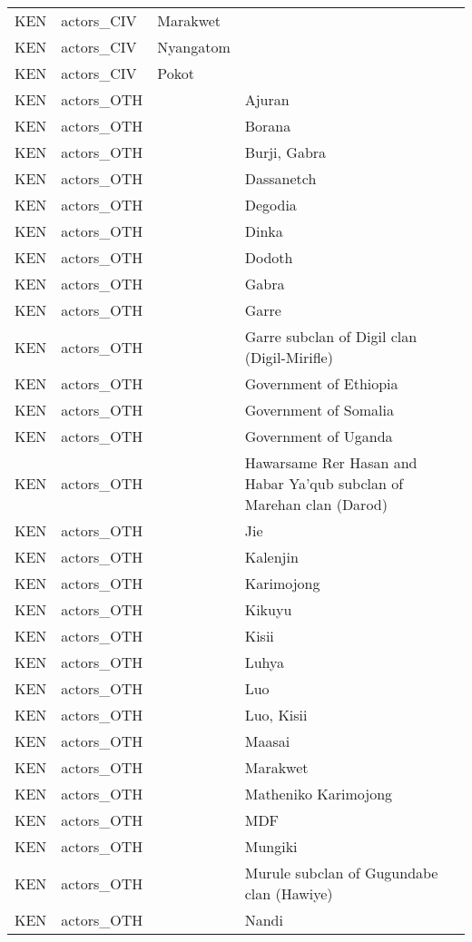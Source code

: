 \begin{table}[ht]
\begin{tabular}{llll}
  KEN & actors\_CIV & Marakwet &  \\ 
  KEN & actors\_CIV & Nyangatom &  \\ 
  KEN & actors\_CIV & Pokot &  \\ 
  KEN & actors\_OTH &  & Ajuran \\ 
  KEN & actors\_OTH &  & Borana \\ 
  KEN & actors\_OTH &  & Burji, Gabra \\ 
  KEN & actors\_OTH &  & Dassanetch \\ 
  KEN & actors\_OTH &  & Degodia \\ 
  KEN & actors\_OTH &  & Dinka \\ 
  KEN & actors\_OTH &  & Dodoth \\ 
  KEN & actors\_OTH &  & Gabra \\ 
  KEN & actors\_OTH &  & Garre \\ 
  KEN & actors\_OTH &  & Garre subclan of Digil clan (Digil-Mirifle) \\ 
  KEN & actors\_OTH &  & Government of Ethiopia \\ 
  KEN & actors\_OTH &  & Government of Somalia \\ 
  KEN & actors\_OTH &  & Government of Uganda \\ 
  KEN & actors\_OTH &  & Hawarsame Rer Hasan and Habar Ya'qub subclan of Marehan clan (Darod) \\ 
  KEN & actors\_OTH &  & Jie \\ 
  KEN & actors\_OTH &  & Kalenjin \\ 
  KEN & actors\_OTH &  & Karimojong \\ 
  KEN & actors\_OTH &  & Kikuyu \\ 
  KEN & actors\_OTH &  & Kisii \\ 
  KEN & actors\_OTH &  & Luhya \\ 
  KEN & actors\_OTH &  & Luo \\ 
  KEN & actors\_OTH &  & Luo, Kisii \\ 
  KEN & actors\_OTH &  & Maasai \\ 
  KEN & actors\_OTH &  & Marakwet \\ 
  KEN & actors\_OTH &  & Matheniko Karimojong \\ 
  KEN & actors\_OTH &  & MDF \\ 
  KEN & actors\_OTH &  & Mungiki \\ 
  KEN & actors\_OTH &  & Murule subclan of Gugundabe clan (Hawiye) \\ 
  KEN & actors\_OTH &  & Nandi \\ 

\end{tabular}
\end{table}
